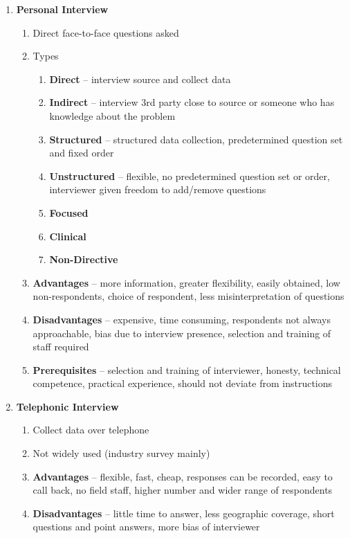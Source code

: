 \documentclass{article}
\begin{document}
\begin{enumerate}
    \item \textbf{Personal Interview}
    \begin{enumerate}
        \item Direct face-to-face questions asked
        \item Types
        \begin{enumerate}
            \item \textbf{Direct} -- interview source and collect data
            \item \textbf{Indirect} -- interview 3rd party close to source or someone who has knowledge about the problem 
            \item \textbf{Structured} -- structured data collection, predetermined question set and fixed order
            \item \textbf{Unstructured} -- flexible, no predetermined question set or order, interviewer given freedom to add/remove questions
            \item \textbf{Focused}
            \item \textbf{Clinical}
            \item \textbf{Non-Directive}
        \end{enumerate}
        \item \textbf{Advantages} -- more information, greater flexibility, easily obtained, low non-respondents, choice of respondent, less misinterpretation of questions
        \item \textbf{Disadvantages} -- expensive, time consuming, respondents not always approachable, bias due to interview presence, selection and training of staff required
        \item \textbf{Prerequisites} -- selection and training of interviewer, honesty, technical competence, practical experience, should not deviate from instructions
    \end{enumerate}
    
    \item \textbf{Telephonic Interview}
    \begin{enumerate}
        \item Collect data over telephone
        \item Not widely used (industry survey mainly)
        \item \textbf{Advantages} -- flexible, fast, cheap, responses can be recorded, easy to call back, no field staff, higher number and wider range of respondents
        \item \textbf{Disadvantages} -- little time to answer, less geographic coverage, short questions and point answers, more bias of interviewer
    \end{enumerate}
\end{enumerate}
\end{document}
